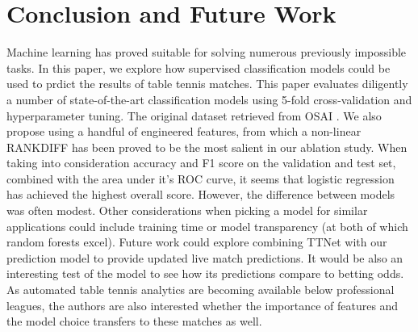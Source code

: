 \section{Conclusion and Future Work} \label{sec:conc}
Machine learning has proved suitable for solving numerous previously impossible tasks. In this paper, we explore how supervised classification models could be used to prdict the results of table tennis matches. 
This paper evaluates diligently a number of state-of-the-art classification models using 5-fold cross-validation and hyperparameter tuning. The original dataset retrieved from OSAI \cite{OSAI}. We also propose using a handful of engineered features, from which a non-linear RANKDIFF has been proved to be the most salient in our ablation study.
When taking into consideration accuracy and F1 score on the validation and test set, combined with the area under it's ROC curve, it seems that logistic regression has  achieved the highest overall score. However, the difference between models was often modest. Other considerations when picking a model for similar applications could include training time or model transparency (at both of which random forests excel).
Future work could explore combining TTNet with our prediction model to provide updated live match predictions. It would be also an interesting test of the model to see how its predictions compare to betting odds. As automated table tennis analytics are becoming available below professional leagues, the authors are also interested whether the importance of features and the model choice transfers to these matches as well.


